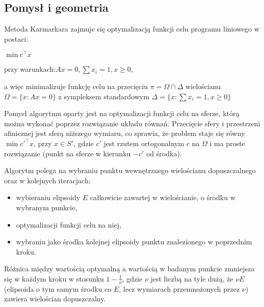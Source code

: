 \documentclass[licencjacka]{pracamgr}
\begin{document}
   \subsection{Pomysł i geometria}
Metoda Karmarkara zajmuje się optymalizacją funkcji celu programu liniowego w postaci:
\centerline{$
\min c^{\top}x$}\newline
\centerline{przy warunkach:$Ax=0,\sum x_i=1,x\ge0$,}
a więc minimalizuje funkcję celu na przecięciu $\pi=\Omega\cap\Delta$ wielościanu $\Omega=\{x:Ax=0\}$ z sympleksem standardowym $\Delta=\{x:\sum x_i=1,x\ge0\}$

Pomysł algorytmu oparty jest na optymalizacji funkcji celu na sferze, którą można wykonać poprzez rozwiązanie układu równań.
Przecięcie sfery i przestrzeni afinicznej jest sferą niższego wymiaru,
co sprawia, że problem staje się równy $\min c'^{\top}x$, przy $x\in S'$, gdzie $c'$ jest rzutem ortogonalnym $c$ na $\Omega$
i ma proste rozwiązanie (punkt na sferze w kierunku $-c'$ od środka).

Algorytm polega na wybraniu punktu wewnętrznego wielościanu dopuszczalnego oraz w kolejnych iteracjach:
\begin{itemize}\itemsep0pt \parskip0pt 
\item wybieraniu elipsoidy $E$ całkowicie zawartej w wielościanie, o środku w wybranym punkcie,
\item optymalizacji funkcji celu na niej,
\item wybraniu jako środka kolejnej elipsoidy punktu znalezionego w poprzednim kroku.
\end{itemize}
%
Różnica między wartością optymalną a wartością w badanym punkcie zmniejsza się w każdym kroku w stosunku $1-\frac{1}{\nu}$, gdzie $\nu$ jest liczbą na tyle dużą,
że $\nu E$ (elipsoida o tym samym środku co $E$, lecz wymiarach przemnożonych przez $\nu$) zawiera wielościan dopuszczalny.\newline
%
\end{document}
